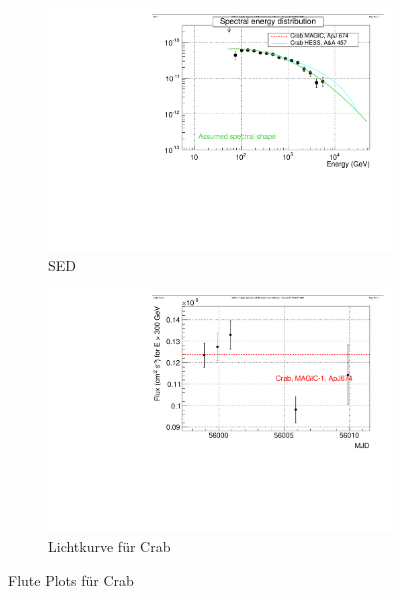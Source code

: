 \begin{figure}
  \hfill
  \begin{subfigure}{0.45\linewidth}
  \includegraphics[width=\textwidth]{./Plots/04_MrkAnalyse/Datenset2/SED.pdf}
  \caption{SED}
  \label{Datenset2_SED_Crab}
  \end{subfigure}
  \hfill
  \begin{subfigure}{0.45\linewidth}
  \includegraphics[width=\textwidth]{./Plots/04_MrkAnalyse/Datenset2/LC.pdf}
  \caption{Lichtkurve für Crab}
  \label{Datenset2_LC_Crab}
  \end{subfigure}
  \hfill
\caption{Flute Plots für Crab}
\label{Datenset2_Flute_Plots_Crab}
\end{figure}

